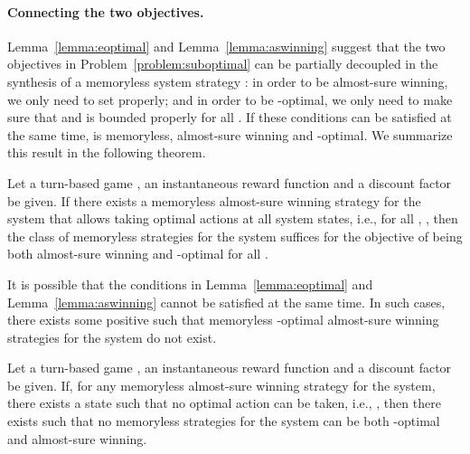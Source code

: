 \documentclass[runningheads,a4paper]{llncs}
\begin{document}
\paragraph{Connecting the two objectives.}
Lemma~\ref{lemma:eoptimal} and Lemma~\ref{lemma:aswinning} suggest that the two objectives in Problem~\ref{problem:suboptimal} can be partially decoupled in the synthesis of a memoryless system strategy : in order to be almost-sure winning, we only need to set  properly; and in order to be -optimal, we only need to make sure that  and  is bounded properly for all . If these conditions can be satisfied at the same time,  is memoryless, almost-sure winning and -optimal. We summarize this result in the following theorem. 

\begin{theorem}
Let a turn-based game , an instantaneous reward function  and a discount factor  be given. If there exists a memoryless almost-sure winning strategy  for the system that allows taking optimal actions at all system states, 
i.e., for all , , then the class of memoryless strategies for the system suffices for the objective of being both almost-sure winning and -optimal for all .
\label{thm:arbitrarye}
\end{theorem}

It is possible that the conditions in Lemma~\ref{lemma:eoptimal} and Lemma~\ref{lemma:aswinning} cannot be satisfied at the same time. In such cases, there exists some positive  such that memoryless -optimal almost-sure winning strategies for the system do not exist. 

\begin{lemma}
Let a turn-based game , an instantaneous reward function  and a discount factor  be given. If, for any memoryless almost-sure winning strategy  for the system, there exists a state  such that no optimal action can be taken, i.e., , then there exists  such that no memoryless strategies for the system can be both -optimal and almost-sure winning.
\label{lemma:epsilonno}
\end{lemma}
\end{document}
